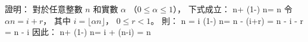 \startEXERCISE
證明：
對於任意整數 $n$ 和實數 $\alpha$ （$0\le \alpha\le 1$），
下式成立：
\startformula
\lfloor\alpha n\rfloor + \lceil(1-\alpha) n\rceil = n
\stopformula
\stopEXERCISE
\startANSWER
令 $\alpha n = i + r$，
其中 $i = \lfloor\alpha n\rfloor$， $0\le r< 1$。
則：
\startsplitformula\startmathalignment
\NC \lfloor \alpha n \rfloor \NC = i \NR
\NC \lceil(1-\alpha) n\rceil \NC = \lceil n - (i+r)\rceil \NR
\NC \NC = \lceil n - i - r \rceil \NR
\NC \NC = n - i \NR
\stopmathalignment\stopsplitformula
因此：
\startformula
\lfloor\alpha n\rfloor + \lceil(1-\alpha) n\rceil = i + (n-i) = n
\stopformula
\stopANSWER
